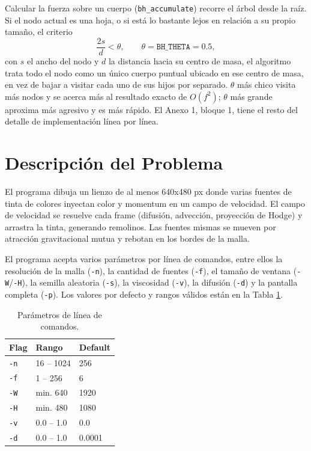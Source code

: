 \documentclass[11pt]{article}
\begin{document}
Calcular la fuerza sobre un cuerpo (\texttt{bh\_accumulate}) recorre el
árbol desde la raíz. Si el nodo actual es una hoja, o si está lo
bastante lejos en relación a su propio tamaño, el criterio
\[
\frac{2s}{d} < \theta, \qquad \theta = \texttt{BH\_THETA} = 0.5,
\]
con $s$ el ancho del nodo y $d$ la distancia hacia su centro de masa, el
algoritmo trata todo el nodo como un único cuerpo puntual ubicado en ese
centro de masa, en vez de bajar a visitar cada uno de sus hijos por
separado. $\theta$ más chico visita más nodos y se acerca más al
resultado exacto de $O(f^2)$; $\theta$ más grande aproxima más agresivo y
es más rápido. El Anexo 1, bloque 1, tiene el resto del detalle de
implementación línea por línea.

\newpage

\section{Descripción del Problema}

El programa dibuja un lienzo de al menos 640x480 px donde varias fuentes
de tinta de colores inyectan color y momentum en un campo de velocidad.
El campo de velocidad se resuelve cada frame (difusión, advección,
proyección de Hodge) y arrastra la tinta, generando remolinos. Las fuentes
mismas se mueven por atracción gravitacional mutua y rebotan en los bordes
de la malla.

El programa acepta varios parámetros por línea de comandos, entre ellos
la resolución de la malla (\texttt{-n}), la cantidad de fuentes
(\texttt{-f}), el tamaño de ventana (\texttt{-W}/\texttt{-H}), la
semilla aleatoria (\texttt{-s}), la viscosidad (\texttt{-v}), la
difusión (\texttt{-d}) y la pantalla completa (\texttt{-p}).
Los valores por defecto y rangos válidos están en la Tabla
\ref{tab:cli-params}.

\begin{table}[ht]
\centering
\begin{tabular}{lll}
\toprule
Flag & Rango & Default \\
\midrule
\texttt{-n} & 16 -- 1024 & 256 \\
\texttt{-f} & 1 -- 256 & 6 \\
\texttt{-W} & min. 640 & 1920 \\
\texttt{-H} & min. 480 & 1080 \\
\texttt{-v} & 0.0 -- 1.0 & 0.0 \\
\texttt{-d} & 0.0 -- 1.0 & 0.0001 \\
\bottomrule
\end{tabular}
\caption{Parámetros de línea de comandos.}
\label{tab:cli-params}
\end{table}
\end{document}
